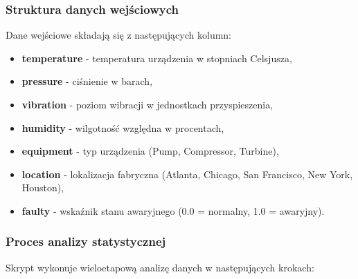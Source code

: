 \subsubsection{Struktura danych wejściowych}

Dane wejściowe składają się z następujących kolumn:
\begin{itemize}
    \item \textbf{temperature} - temperatura urządzenia w stopniach Celsjusza,
    \item \textbf{pressure} - ciśnienie w barach,
    \item \textbf{vibration} - poziom wibracji w jednostkach przyspieszenia,
    \item \textbf{humidity} - wilgotność względna w procentach,
    \item \textbf{equipment} - typ urządzenia (Pump, Compressor, Turbine),
    \item \textbf{location} - lokalizacja fabryczna (Atlanta, Chicago, San Francisco, New York, Houston),
    \item \textbf{faulty} - wskaźnik stanu awaryjnego (0.0 = normalny, 1.0 = awaryjny).
\end{itemize}

\subsubsection{Proces analizy statystycznej}

Skrypt wykonuje wieloetapową analizę danych w następujących krokach:

